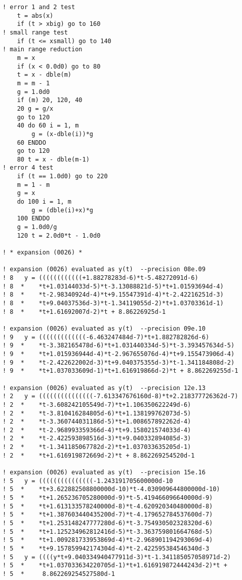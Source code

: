 \documentclass[12pt]{article}
\begin{document}
\begin{lstlisting}[frame=single,caption={{\tt d01b.f90}},label=d01b]
! error 1 and 2 test
    t = abs(x)
    if (t > xbig) go to 160
! small range test
    if (t <= xsmall) go to 140
! main range reduction
    m = x
    if (x < 0.0d0) go to 80
    t = x - dble(m)
    m = m - 1
    g = 1.0d0
    if (m) 20, 120, 40
    20 g = g/x
    go to 120
    40 do 60 i = 1, m
        g = (x-dble(i))*g
    60 ENDDO
    go to 120
    80 t = x - dble(m-1)
! error 4 test
    if (t == 1.0d0) go to 220
    m = 1 - m
    g = x
    do 100 i = 1, m
        g = (dble(i)+x)*g
    100 ENDDO
    g = 1.0d0/g
    120 t = 2.0d0*t - 1.0d0

! * expansion (0026) *

! expansion (0026) evaluated as y(t)  --precision 08e.09
! 8   y = ((((((((((((+1.88278283d-6)*t-5.48272091d-6)
! 8  *    *t+1.03144033d-5)*t-3.13088821d-5)*t+1.01593694d-4)
! 8  *    *t-2.98340924d-4)*t+9.15547391d-4)*t-2.42216251d-3)
! 8  *    *t+9.04037536d-3)*t-1.34119055d-2)*t+1.03703361d-1)
! 8  *    *t+1.61692007d-2)*t + 8.86226925d-1

! expansion (0026) evaluated as y(t)  --precision 09e.10
! 9   y = (((((((((((((-6.463247484d-7)*t+1.882782826d-6)
! 9  *    *t-3.382165478d-6)*t+1.031440334d-5)*t-3.393457634d-5)
! 9  *    *t+1.015936944d-4)*t-2.967655076d-4)*t+9.155473906d-4)
! 9  *    *t-2.422622002d-3)*t+9.040375355d-3)*t-1.341184808d-2)
! 9  *    *t+1.037033609d-1)*t+1.616919866d-2)*t + 8.862269255d-1

! expansion (0026) evaluated as y(t)  --precision 12e.13
! 2   y = (((((((((((((((-7.613347676160d-8)*t+2.218377726362d-7)
! 2  *    *t-3.608242105549d-7)*t+1.106350622249d-6)
! 2  *    *t-3.810416284805d-6)*t+1.138199762073d-5)
! 2  *    *t-3.360744031186d-5)*t+1.008657892262d-4)
! 2  *    *t-2.968993359366d-4)*t+9.158021574033d-4)
! 2  *    *t-2.422593898516d-3)*t+9.040332894085d-3)
! 2  *    *t-1.341185067782d-2)*t+1.037033635205d-1)
! 2  *    *t+1.616919872669d-2)*t + 8.862269254520d-1

! expansion (0026) evaluated as y(t)  --precision 15e.16
! 5   y = (((((((((((((((-1.243191705600000d-10
! 5  *    *t+3.622882508800000d-10)*t-4.030909644800000d-10)
! 5  *    *t+1.265236705280000d-9)*t-5.419466096640000d-9)
! 5  *    *t+1.613133578240000d-8)*t-4.620920340480000d-8)
! 5  *    *t+1.387603440435200d-7)*t-4.179652784537600d-7)
! 5  *    *t+1.253148247777280d-6)*t-3.754930502328320d-6)
! 5  *    *t+1.125234962812416d-5)*t-3.363759801664768d-5)
! 5  *    *t+1.009281733953869d-4)*t-2.968901194293069d-4)
! 5  *    *t+9.157859942174304d-4)*t-2.422595384546340d-3
! 5   y = ((((y*t+9.040334940477911d-3)*t-1.341185057058971d-2)
! 5  *    *t+1.037033634220705d-1)*t+1.616919872444243d-2)*t +
! 5  *     8.862269254527580d-1


\end{lstlisting}
\end{document}
